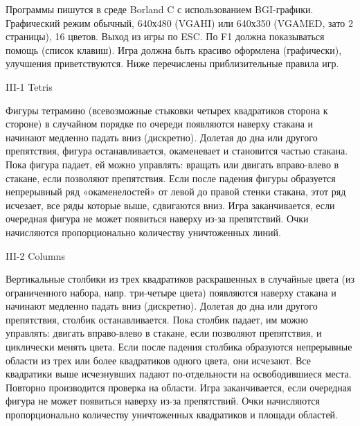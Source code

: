 
Программы пишутся в среде Borland C с использованием BGI-графики. Графический
режим обычный, 640х480 (VGAHI) или 640х350 (VGAMED, зато 2 страницы), 16
цветов. Выход из игры по ESC. По F1 должна показываться помощь (список
клавиш). Игра должна быть красиво оформлена (графически), улучшения
приветствуются. Ниже перечислены приблизительные правила игр.


III-1 Tetris

Фигуры тетрамино (всевозможные стыковки четырех квадратиков сторона к стороне)
в случайном порядке по очереди появляются наверху стакана и начинают медленно
падать вниз (дискретно). Долетая до дна или другого препятствия, фигура
останавливается, окаменевает и становится частью стакана. Пока фигура падает,
ей можно управлять: вращать или двигать вправо-влево в стакане, если позволяют
препятствия. Если после падения фигуры образуется непрерывный ряд
«окаменелостей» от левой до правой стенки стакана, этот ряд исчезает, все ряды
которые выше, сдвигаются вниз. Игра заканчивается, если очередная фигура не
может появиться наверху из-за препятствий. Очки начисляются пропорционально
количеству уничтоженных линий.


III-2 Columns

Вертикальные столбики из трех квадратиков раскрашенных в случайные цвета (из
ограниченного набора, напр. три-четыре цвета) появляются наверху стакана и
начинают медленно падать вниз (дискретно). Долетая до дна или другого
препятствия, столбик останавливается. Пока столбик падает, им можно управлять:
двигать вправо-влево в стакане, если позволяют препятствия, и циклически
менять цвета. Если после падения столбика образуются непрерывные области из
трех или более квадратиков одного цвета, они исчезают. Все квадратики выше
исчезнувших падают по-отдельности на освободившиеся места. Повторно
производится проверка на области. Игра заканчивается, если очередная фигура не
может появиться наверху из-за препятствий. Очки начисляются пропорционально
количеству уничтоженных квадратиков и площади областей.


